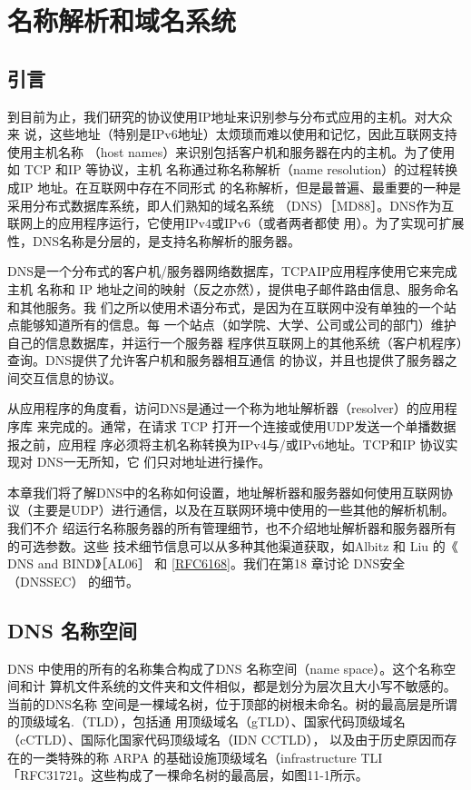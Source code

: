 \chapter{名称解析和域名系统}
\minitoc

\section{引言}

到目前为止，我们研究的协议使用IP地址来识别参与分布式应用的主机。对大众来
说，这些地址（特别是IPv6地址）太烦琐而难以使用和记忆，因此互联网支持使用主机名称
（host names）来识别包括客户机和服务器在内的主机。为了使用如 TCP 和IP 等协议，主机
名称通过称名称解析（name resolution）的过程转换成IP 地址。在互联网中存在不同形式
的名称解析，但是最普遍、最重要的一种是采用分布式数据库系统，即人们熟知的域名系统
（DNS）［MD88］。DNS作为互联网上的应用程序运行，它使用IPv4或IPv6（或者两者都使
用）。为了实现可扩展性，DNS名称是分层的，是支持名称解析的服务器。

DNS是一个分布式的客户机/服务器网络数据库，TCPAIP应用程序使用它来完成主机
名称和 IP 地址之间的映射（反之亦然），提供电子邮件路由信息、服务命名和其他服务。我
们之所以使用术语分布式，是因为在互联网中没有单独的一个站点能够知道所有的信息。每
一个站点（如学院、大学、公司或公司的部门）维护自己的信息数据库，并运行一个服务器
程序供互联网上的其他系统（客户机程序）查询。DNS提供了允许客户机和服务器相互通信
的协议，并且也提供了服务器之间交互信息的协议。

从应用程序的角度看，访问DNS是通过一个称为地址解析器（resolver）的应用程序库
来完成的。通常，在请求 TCP 打开一个连接或使用UDP发送一个单播数据报之前，应用程
序必须将主机名称转换为IPv4与/或IPv6地址。TCP和IP 协议实现对 DNS一无所知，它
们只对地址进行操作。

本章我们将了解DNS中的名称如何设置，地址解析器和服务器如何使用互联网协
议（主要是UDP）进行通信，以及在互联网环境中使用的一些其他的解析机制。我们不介
绍运行名称服务器的所有管理细节，也不介绍地址解析器和服务器所有的可选参数。这些
技术细节信息可以从多种其他渠道获取，如Albitz 和 Liu 的《 DNS and BIND》［AL06］ 和
\href{https://www.rfc-editor.org/rfc/rfc6168}{[RFC6168]}。我们在第18 章讨论 DNS安全（DNSSEC） 的细节。

\section{DNS 名称空间}

DNS 中使用的所有的名称集合构成了DNS 名称空间（name space）。这个名称空间和计
算机文件系统的文件夹和文件相似，都是划分为层次且大小写不敏感的。当前的DNS名称
空间是一棵域名树，位于顶部的树根未命名。树的最高层是所谓的顶级域名.（TLD），包括通
用顶级域名（gTLD）、国家代码顶级域名（cCTLD）、国际化国家代码顶级域名（IDN CCTLD），
以及由于历史原因而存在的一类特殊的称 ARPA 的基础设施顶级域名（infrastructure TLI
「RFC31721。这些构成了一棵命名树的最高层，如图11-1所示。

